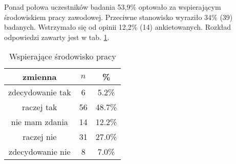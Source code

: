
Ponad połowa uczestników badania 53,9\% optowało za wspierającym środowiskiem pracy zawodowej. Przeciwne stanowisko wyraziło 34\% (39) badanych. Wstrzymało się od opinii 12,2\% (14) ankietowanych. Rozkład odpowiedzi zawarty jest w tab. \ref{tab:Q7}.

\begin{table}[H]
\caption{Wspierające środowisko pracy}
\centering
\begin{tabular}{ | c | c | c |}
\hline
zmienna & $n$ & \% \\
\hline
zdecydowanie tak  &  6  & 5.2\% \\
\hline
raczej tak  &  56  & 48.7\% \\
\hline
nie mam zdania  &  14  & 12.2\% \\
\hline
raczej nie  &  31  & 27.0\% \\
\hline
zdecydowanie nie  &  8  & 7.0\% \\
\hline
\end{tabular}
\label{tab:Q7}
\end{table}
